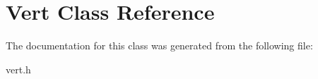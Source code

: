 \hypertarget{class_vert}{}\section{Vert Class Reference}
\label{class_vert}


The documentation for this class was generated from the following file\+:\begin{DoxyCompactItemize}
\item 
vert.\+h\end{DoxyCompactItemize}
